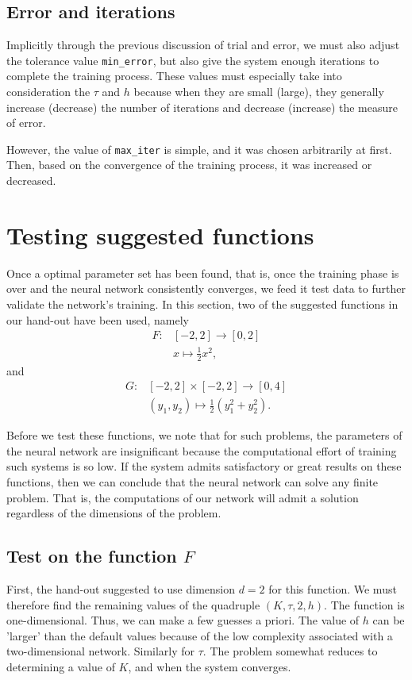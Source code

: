 \documentclass{article}
\begin{document}
\subsection{Error and iterations}
Implicitly through the previous discussion of trial and error, we must also adjust the tolerance value \verb|min_error|, but also give the system enough iterations to complete the training process. These values must especially take into consideration the $\tau$ and $h$ because when they are small (large), they generally increase (decrease) the number of iterations and decrease (increase) the measure of error.

However, the value of \verb|max_iter| is simple, and it was chosen arbitrarily at first. Then, based on the convergence of the training process, it was increased or decreased.

\section{Testing suggested functions}
\label{section 5}
Once a optimal parameter set has been found, that is, once the training phase is over and the neural network consistently converges, we feed it test data to further validate the network's training. In this section, two of the suggested functions in our hand-out have been used, namely 
\begin{align*}
    F \colon &[-2, 2] \to [0, 2] \\ 
    &x \mapsto \frac{1}{2} x^2, 
\end{align*}
and 
\begin{align*}
    \label{eq:G}
    G \colon &[-2, 2] \times [-2, 2] \to [0, 4] \\
    &(y_1, y_2) \mapsto \frac{1}{2} (y_1^2 + y_2^2).
\end{align*}

Before we test these functions, we note that for such problems, the parameters of the neural network are insignificant because the computational effort of training such systems is so low. If the system admits satisfactory or great results on these functions, then we can conclude that the neural network can solve any finite problem. That is, the computations of our network will admit a solution regardless of the dimensions of the problem.

\subsection{Test on the function $F$} \label{eq:F}
First, the hand-out suggested to use dimension $d = 2$ for this function. We must therefore find the remaining values of the quadruple $(K, \tau, 2, h)$. The function is one-dimensional. Thus, we can make a few guesses a priori. The value of $h$ can be 'larger' than the default values because of the low complexity associated with a two-dimensional network. Similarly for $\tau$. The problem somewhat reduces to determining a value of $K$, and when the system converges.
\end{document}
